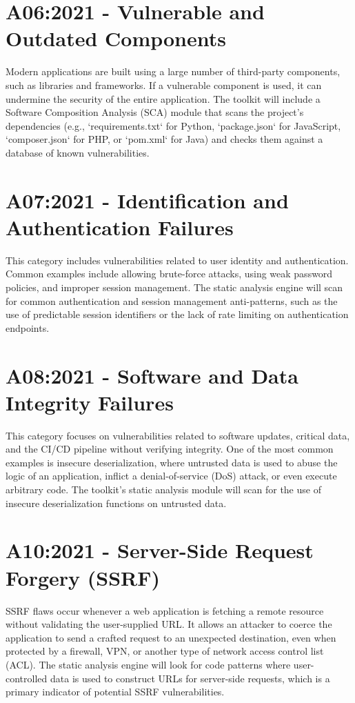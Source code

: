\section{A06:2021 - Vulnerable and Outdated Components}
Modern applications are built using a large number of third-party components, such as libraries and frameworks. If a vulnerable component is used, it can undermine the security of the entire application.
The toolkit will include a Software Composition Analysis (SCA) module that scans the project's dependencies (e.g., `requirements.txt` for Python, `package.json` for JavaScript, `composer.json` for PHP, or `pom.xml` for Java) and checks them against a database of known vulnerabilities.

\section{A07:2021 - Identification and Authentication Failures}
This category includes vulnerabilities related to user identity and authentication. Common examples include allowing brute-force attacks, using weak password policies, and improper session management.
The static analysis engine will scan for common authentication and session management anti-patterns, such as the use of predictable session identifiers or the lack of rate limiting on authentication endpoints.

\section{A08:2021 - Software and Data Integrity Failures}
This category focuses on vulnerabilities related to software updates, critical data, and the CI/CD pipeline without verifying integrity. One of the most common examples is insecure deserialization, where untrusted data is used to abuse the logic of an application, inflict a denial-of-service (DoS) attack, or even execute arbitrary code.
The toolkit's static analysis module will scan for the use of insecure deserialization functions on untrusted data.

\section{A10:2021 - Server-Side Request Forgery (SSRF)}
SSRF flaws occur whenever a web application is fetching a remote resource without validating the user-supplied URL. It allows an attacker to coerce the application to send a crafted request to an unexpected destination, even when protected by a firewall, VPN, or another type of network access control list (ACL).
The static analysis engine will look for code patterns where user-controlled data is used to construct URLs for server-side requests, which is a primary indicator of potential SSRF vulnerabilities.